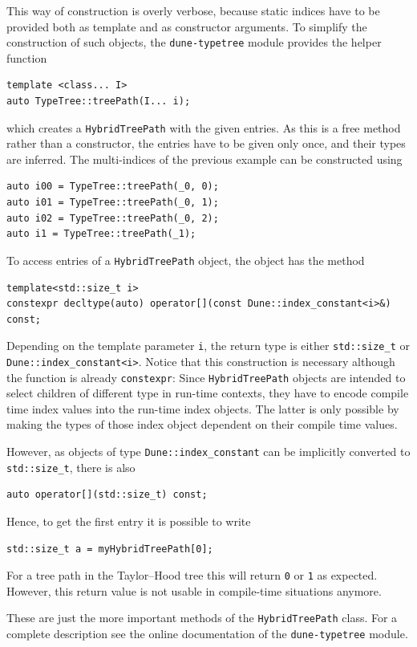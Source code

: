 \documentclass[a4paper,10pt,headings=normal,bibliography=totoc]{scrartcl}
\newcommand{\cpp}[1]{\lstinline[basicstyle=\ttfamily]!#1!}
\newcommand{\dunemodule}[1]{\texttt{#1}}
\begin{document}
This way of construction is overly verbose, because static indices have
to be provided both as template and as constructor arguments.
To simplify the construction of such objects, the \dunemodule{dune-typetree}
module provides the helper function
\begin{lstlisting}[style=Interface]
template <class... I>
auto TypeTree::treePath(I... i);
\end{lstlisting}
which creates a \cpp{HybridTreePath} with the given entries.
As this is a free method rather than a constructor, the entries have to be
given only once, and their types are inferred.
The multi-indices of the previous example can be constructed using
\begin{lstlisting}[style=Example]
auto i00 = TypeTree::treePath(_0, 0);
auto i01 = TypeTree::treePath(_0, 1);
auto i02 = TypeTree::treePath(_0, 2);
auto i1 = TypeTree::treePath(_1);
\end{lstlisting}
To access entries of a \cpp{HybridTreePath} object, the object has
the method
%
\begin{lstlisting}[style=Interface]
template<std::size_t i>
constexpr decltype(auto) operator[](const Dune::index_constant<i>&) const;
\end{lstlisting}
%
Depending on the template parameter \cpp{i}, the return type is either \cpp{std::size_t}
or \cpp{Dune::index_constant<i>}.
Notice that this construction is necessary although the function is already
\cpp{constexpr}:
Since \cpp{HybridTreePath} objects are intended to select
children of different type in run-time contexts, they have to encode
compile time index values into the run-time index objects.
The latter is only possible by making the types of those index object
dependent on their compile time values.

However, as objects of type \cpp{Dune::index_constant} can be implicitly converted
to \cpp{std::size_t}, there is also
%
\begin{lstlisting}[style=Interface]
auto operator[](std::size_t) const;
\end{lstlisting}
%
Hence, to get the first entry it is possible to write
\begin{lstlisting}[style=Example]
std::size_t a = myHybridTreePath[0];
\end{lstlisting}
For a tree path in the Taylor--Hood tree this will return \cpp{0} or \cpp{1}
as expected.  However, this return value is not usable in compile-time situations
anymore.

These are just the more important methods of the \cpp{HybridTreePath} class.
For a complete description see the online
documentation of the \dunemodule{dune-typetree} module.
\end{document}
